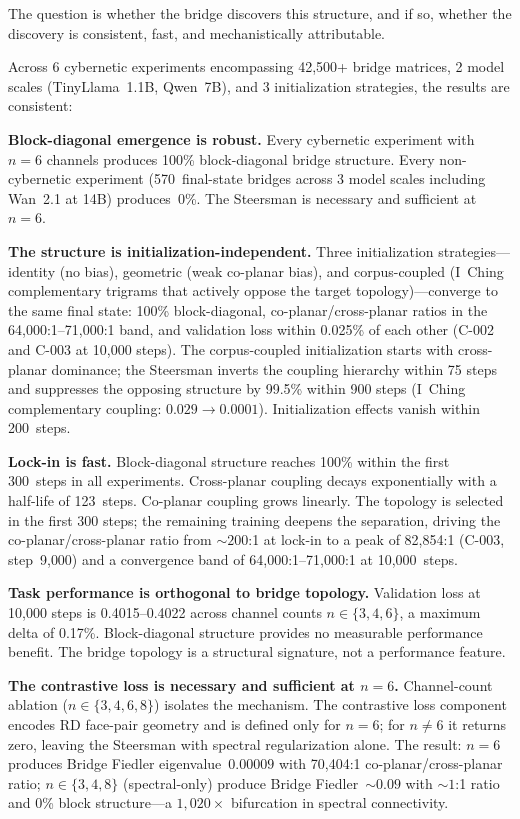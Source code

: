 \documentclass[11pt]{article}
\begin{document}
The question is whether the bridge discovers this structure, and if
so, whether the discovery is consistent, fast, and mechanistically
attributable.

Across 6 cybernetic experiments encompassing 42{,}500+ bridge
matrices, 2 model scales (TinyLlama~1.1B, Qwen~7B), and 3
initialization strategies, the results are consistent:

\textbf{Block-diagonal emergence is robust.} Every cybernetic
experiment with $n = 6$ channels produces 100\% block-diagonal bridge
structure. Every non-cybernetic experiment (570~final-state bridges
across 3 model scales including Wan~2.1 at 14B) produces~0\%. The
Steersman is necessary and sufficient at $n = 6$.

\textbf{The structure is initialization-independent.} Three
initialization strategies---identity (no bias), geometric (weak
co-planar bias), and corpus-coupled (I~Ching complementary trigrams
that actively oppose the target topology)---converge to the same final
state: 100\% block-diagonal, co-planar/cross-planar ratios in the
64{,}000:1--71{,}000:1 band, and validation loss within 0.025\% of
each other (C-002 and C-003 at 10{,}000 steps). The corpus-coupled initialization starts with cross-planar
dominance; the Steersman inverts the coupling hierarchy within 75
steps and suppresses the opposing structure by 99.5\% within 900
steps (I~Ching complementary coupling:
$0.029 \to 0.0001$). Initialization effects vanish within 200~steps.

\textbf{Lock-in is fast.} Block-diagonal structure reaches 100\% within
the first 300~steps in all experiments. Cross-planar coupling decays
exponentially with a half-life of 123~steps. Co-planar coupling grows
linearly. The topology is selected in the first 300 steps; the
remaining training deepens the separation, driving the
co-planar/cross-planar ratio from ${\sim}200$:1 at lock-in to a peak
of 82{,}854:1 (C-003, step~9{,}000) and a convergence band of
64{,}000:1--71{,}000:1 at 10{,}000~steps.

\textbf{Task performance is orthogonal to bridge topology.} Validation
loss at 10{,}000 steps is 0.4015--0.4022 across channel counts
$n \in \{3, 4, 6\}$, a maximum delta of 0.17\%. Block-diagonal
structure provides no measurable performance benefit. The bridge
topology is a structural signature, not a performance feature.

\textbf{The contrastive loss is necessary and sufficient at $n = 6$.}
Channel-count ablation ($n \in \{3, 4, 6, 8\}$) isolates the
mechanism. The contrastive loss component encodes RD face-pair
geometry and is defined only for $n = 6$; for $n \neq 6$ it returns
zero, leaving the Steersman with spectral regularization alone. The
result: $n = 6$ produces Bridge Fiedler eigenvalue~$0.00009$ with
70{,}404:1 co-planar/cross-planar ratio; $n \in \{3, 4, 8\}$
(spectral-only) produce Bridge Fiedler~${\sim}0.09$ with
${\sim}1$:1 ratio and 0\% block structure---a $1{,}020\times$
bifurcation in spectral connectivity.
\end{document}
